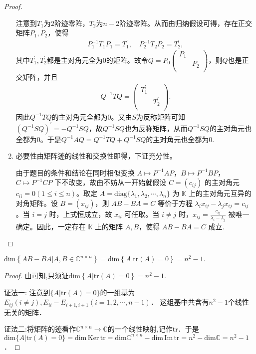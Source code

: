 \documentclass[../../main.tex]{subfiles}
\begin{document}
\begin{proof}
\begin{enumerate}[(1)]
注意到\(T_1\)为\(2\)阶迹零阵，\(T_2\)为\(n - 2\)阶迹零阵。从而由归纳假设可得，存在正交矩阵\(P_1,P_2\)，使得
\begin{align*}
P_{1}^{-1}T_1P_1=T_{1}^{\prime},\quad P_{2}^{-1}T_2P_2=T_{2}^{\prime},
\end{align*}
其中\(T_{1}^{\prime},T_{2}^{\prime}\)都是主对角元全为\(0\)的矩阵。故令\(Q = P_0\left( \begin{matrix}
P_1& \\
& P_2\\
\end{matrix} \right)\)，则\(Q\)也是正交矩阵，并且
\begin{align*}
Q^{-1}TQ=\left( \begin{matrix}
T_{1}^{\prime}& \\
& T_{2}^{\prime}\\
\end{matrix} \right).
\end{align*}
因此\(Q^{-1}TQ\)的主对角元全都为\(0\)。又由\(S\)为反称矩阵可知\((Q^{-1}SQ)^\prime = -Q^{-1}SQ\)，故\(Q^{-1}SQ\)也为反称矩阵，从而\(Q^{-1}SQ\)的主对角元也全都为\(0\)。于是\(Q^{-1}AQ = Q^{-1}TQ + Q^{-1}SQ\)的主对角元也全都为\(0\).

\item 必要性由矩阵迹的线性和交换性即得，下证充分性。

由于题目的条件和结论在同时相似变换 $A\mapsto P^{-1}AP$，$B\mapsto P^{-1}BP$，$C\mapsto P^{-1}CP$ 下不改变，故由不妨从一开始就假设 $C=(c_{ij})$ 的主对角元 $c_{ii}=0 (1\leqslant  i\leqslant  n)$。取定 $A = \mathrm{diag}\{\lambda_1,\lambda_2,\cdots,\lambda_n\}$ 为 $\mathbb{K}$ 上的主对角元互异的对角矩阵。设 $B=(x_{ij})$，则 $AB - BA = C$ 等价于方程 $\lambda_ix_{ij}-\lambda_jx_{ij}=c_{ij}$。当 $i = j$ 时，上式恒成立，故 $x_{ii}$ 可任取。当 $i\neq j$ 时，$x_{ij}=\frac{c_{ij}}{\lambda_i - \lambda_j}$ 被唯一确定。因此，一定存在 $\mathbb{K}$ 上的矩阵 $A,B$，使得 $AB - BA = C$ 成立.
\end{enumerate}
\end{proof}

\begin{corollary}\label{corollary:AB-BA的维数等于迹零矩阵的维数}
$\mathrm{dim}\left\{ AB-BA|A,B\in \mathbb{C} ^{n\times n} \right\} =\mathrm{dim}\left\{ A|\mathrm{tr}\left( A \right) =0 \right\} =n^2-1.$
\end{corollary}
\begin{proof}
由可知,只须证$\mathrm{dim}\left\{ A|\mathrm{tr}\left( A \right) =0 \right\} =n^2-1.$

{\color{blue} 证法一:}
注意到$\{ A|\mathrm{tr}(A) =0 \}$的一组基为  
$E_{ij}(i\ne j),E_{ii}-E_{i+1,i+1}(i=1,2,\cdots,n-1)$．  
这组基中共含有$n^2-1$个线性无关的矩阵．  

{\color{blue} 证法二:}将矩阵的迹看作$\mathbb{C} ^{n\times n}\rightarrow \mathbb{C}$的一个线性映射,记作$\mathrm{tr}$．于是  
$\mathrm{dim}\{ A|\mathrm{tr}(A) =0 \} = \mathrm{dim}\,\mathrm{Ker}\,\mathrm{tr} = \mathrm{dim}\mathbb{C} ^{n\times n} - \mathrm{dim}\,\mathrm{Im}\,\mathrm{tr} = n^2 - \mathrm{dim}\mathbb{C} = n^2-1$．
\end{proof}
\end{document}
